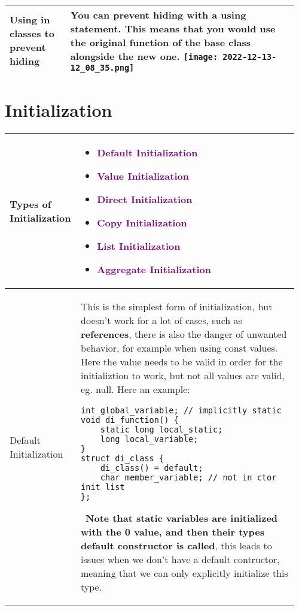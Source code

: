 \documentclass[main.tex,fontsize=8pt,paper=a4,paper=portrait,DIV=calc]{scrartcl}
\begin{document}
\begin{table}[ht!]
\begin{tabular}{|m{0.2\linewidth}|m{0.755\linewidth}|}
\hline
Using in classes to prevent hiding & 
You can prevent hiding with a \textbf{using} statement.\newline
This means that you would use the original function of the base class alongside the new one.\newline
\texttt{[image: 2022-12-13-12\_08\_35.png]}\\
\hline
\end{tabular}
\section{Initialization}
\begin{tabular}{|m{0.2\linewidth}|m{0.755\linewidth}|}
\hline
Types of Initialization & 
\vspace{2mm}
\begin{itemize}
\item \textcolor{purple}{Default Initialization}
\item \textcolor{purple}{Value Initialization}
\item \textcolor{purple}{Direct Initialization}
\item \textcolor{purple}{Copy Initialization}
\item \textcolor{purple}{List Initialization}
\item \textcolor{purple}{Aggregate Initialization}
\vspace{-3mm}
\end{itemize} 
\\
\hline
Default Initialization & 
This is the simplest form of initialization, but doesn't work for a lot of cases, such as \textbf{references}, there is also the danger of unwanted behavior, for example when using const values. Here the value needs to be valid in order for the initializtion to work, but not all values are valid, eg. null.\newline 
Here an example:\newline 
\begin{lstlisting}
int global_variable; // implicitly static
void di_function() {
    static long local_static;
    long local_variable;
}
struct di_class {
    di_class() = default;
    char member_variable; // not in ctor init list
};
\end{lstlisting}
\, \newline
\textbf{Note that static variables are initialized with the 0 value, and then their types default constructor is called}, this leads to issues when we don't have a default contructor, meaning that we can only explicitly initialize this type.\newline 

\end{tabular}
\end{table}
\end{document}
